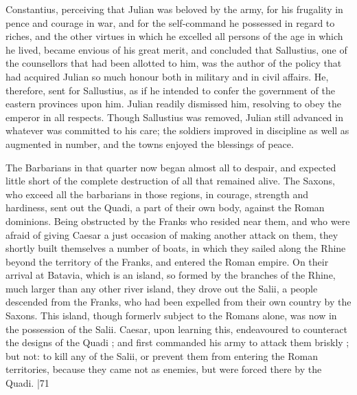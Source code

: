 Constantius, perceiving that Julian was beloved by the army, for his frugality in pence and courage in war, and for the self-command he possessed in regard to riches, and the other virtues in which he excelled all persons of the age in which he lived, became envious of his great merit, and concluded that Sallustius, one of the counsellors that had been allotted to him, was the author of the policy that had acquired Julian so much honour both in military and in civil affairs. He, therefore, sent for Sallustius, as if he intended to confer the government of the eastern provinces upon him. Julian readily dismissed him, resolving to obey the emperor in all respects. Though Sallustius was removed, Julian still advanced in whatever was committed to his care; the soldiers improved in discipline as well as augmented in number, and the towns enjoyed the blessings of peace.

The Barbarians in that quarter now began almost all to despair, and expected little short of the complete destruction of all that remained alive. The Saxons, who exceed all the barbarians in those regions, in courage, strength and hardiness, sent out the Quadi, a part of their own body, against the Roman dominions. Being obstructed by the Franks who resided near them, and who were afraid of giving Caesar a just occasion of making another attack on them, they shortly built themselves a number of boats, in which they sailed along the Rhine beyond the territory of the Franks, and entered the Roman empire. On their arrival at Batavia, which is an island, so formed by the branches of the Rhine, much larger than any other river island, they drove out the Salii, a people descended from the Franks, who had been expelled from their own country by the Saxons. This island, though formerlv subject to the Romans alone, was now in the possession of the Salii. Caesar, upon learning this, endeavoured to counteract the designs of the Quadi ; and first commanded his army to attack them briskly ; but not: to kill any of the Salii, or prevent them from entering the Roman territories, because they came not as enemies, but were forced there by the Quadi.
|71

